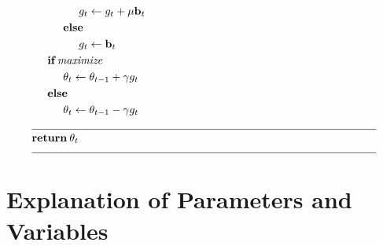 \documentclass{article}
\begin{document}
\[\begin{aligned}
    & \hspace{15mm} g_t \leftarrow g_t + \mu \textbf{b}_t \\
    & \hspace{10mm} \textbf{else} \\
    & \hspace{15mm} g_t \leftarrow \textbf{b}_t \\
    & \hspace{5mm} \textbf{if} \: \textit{maximize} \\
    & \hspace{10mm} \theta_t \leftarrow \theta_{t-1} + \gamma g_t \\
    & \hspace{5mm} \textbf{else} \\
    & \hspace{10mm} \theta_t \leftarrow \theta_{t-1} - \gamma g_t \\
    & \rule{110mm}{0.4pt} \\[-1.ex]
    & \textbf{return} \: \theta_t \\[-1.ex]
    & \rule{110mm}{0.4pt} \\[-1.ex]
\end{aligned}
\]

\section*{Explanation of Parameters and Variables}
\end{document}
